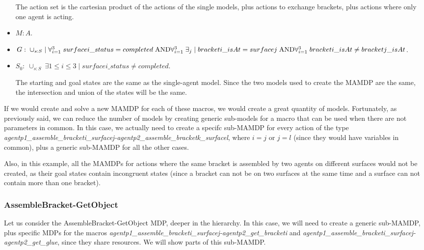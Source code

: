 \begin{itemize}
	The action set is the cartesian product of the actions of the single models, plus actions to exchange brackets, plus actions where only one agent is acting.
	\item $M: A$.
	\item $G:\; \cup_{s:S}\; |\; \forall_{i=1}^3\; surfacei\_status=completed\;\text{AND}\\
	\forall_{i=1}^3\; \exists_{j}\;|\;bracketi\_isAt=surfacej\; \text{AND}\\
	\forall_{i=1}^3\; bracketi\_isAt \neq bracketj\_isAt$.
	\item $S_0:\; \cup_{s:S} \; \exists{1\leq i \leq 3}\; |\; surfacei\_status \neq completed$.

	The starting and goal states are the same as the single-agent model. Since the two models used to create the MAMDP are the same, the intersection and union of the states will be the same.
\end{itemize}


If we would create and solve a new MAMDP for each of these macros, we would create a great quantity of models. Fortunately, as previously said, we can reduce the number of models by creating generic sub-models for a macro that can be used when there are not parameters in common. In this case, we actually need to create a specifc sub-MAMDP for every action of the type \textit{agentp1\_assemble\_bracketi\_surfacej-agentp2\_assemble\_bracketk\_surfacel}, where $i=j$ or $j=l$ (since they would have variables in common), plus a generic sub-MAMDP for all the other cases.

Also, in this example, all the MAMDPs for actions where the same bracket is assembled by two agents on different surfaces would not be created, as their goal states contain incongruent states (since a bracket can not be on two surfaces at the same time and a surface can not contain more than one bracket).

\subsubsection{AssembleBracket-GetObject}
Let us consider the AssembleBracket-GetObject MDP, deeper in the hierarchy. In this case, we will need to create a generic sub-MAMDP, plus specific MDPs for the macros \textit{agentp1\_assemble\_bracketi\_surfacej-agentp2\_get\_bracketi} and \textit{agentp1\_assemble\_bracketi\_surfacej-agentp2\_get\_glue}, since they share resources. We will show parts of this sub-MAMDP.  


